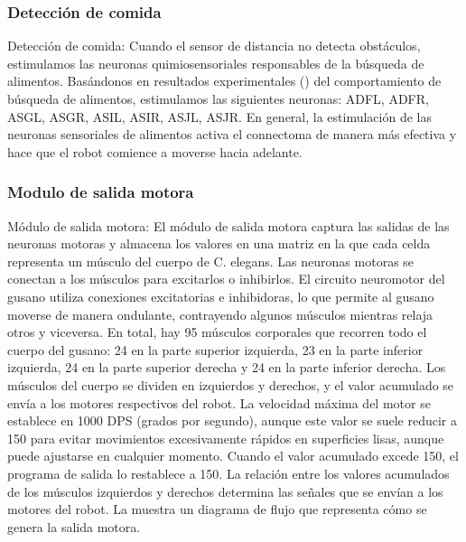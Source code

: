 \subsubsection{Detección de comida}

Detección de comida: Cuando el sensor de distancia no detecta obstáculos, estimulamos las neuronas quimiosensoriales responsables de la búsqueda de alimentos. Basándonos en resultados experimentales () del comportamiento de búsqueda de alimentos, estimulamos las siguientes neuronas: ADFL, ADFR, ASGL, ASGR, ASIL, ASIR, ASJL, ASJR. En general, la estimulación de las neuronas sensoriales de alimentos activa el connectoma de manera más efectiva y hace que el robot comience a moverse hacia adelante.


 \subsubsection{Modulo de salida motora}
 
 
 Módulo de salida motora: El módulo de salida motora captura las salidas de las neuronas motoras y almacena los valores en una matriz en la que cada celda representa un músculo del cuerpo de C. elegans. Las neuronas motoras se conectan a los músculos para excitarlos o inhibirlos. El circuito neuromotor del gusano utiliza conexiones excitatorias e inhibidoras, lo que permite al gusano moverse de manera ondulante, contrayendo algunos músculos mientras relaja otros y viceversa. En total, hay 95 músculos corporales que recorren todo el cuerpo del gusano: 24 en la parte superior izquierda, 23 en la parte inferior izquierda, 24 en la parte superior derecha y 24 en la parte inferior derecha. Los músculos del cuerpo se dividen en izquierdos y derechos, y el valor acumulado se envía a los motores respectivos del robot. La velocidad máxima del motor se establece en 1000 DPS (grados por segundo), aunque este valor se suele reducir a 150 para evitar movimientos excesivamente rápidos en superficies lisas, aunque puede ajustarse en cualquier momento. Cuando el valor acumulado excede 150, el programa de salida lo restablece a 150. La relación entre los valores acumulados de los músculos izquierdos y derechos determina las señales que se envían a los motores del robot. La  muestra un diagrama de flujo que representa cómo se genera la salida motora.
 


